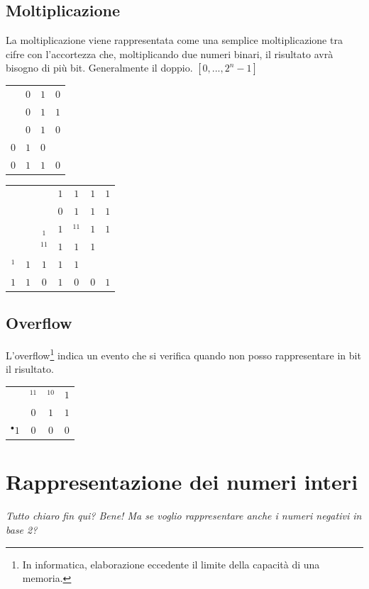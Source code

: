 \subsection*{Moltiplicazione}
La moltiplicazione viene rappresentata come una semplice moltiplicazione tra cifre con l'accortezza che, moltiplicando due numeri binari, il risultato avrà bisogno di più bit. Generalmente il doppio. $[0,...,2^n-1]$
\begin{center}
    \begin{tabular}{c c c c}
        \centering
        & $0$ & $1$ & $0$\\
        & $0$ & $1$ & $1$\\\hline
        & $0$ & $1$ & $0$\\
        $0$ & $1$ & $0$ &\\\hline
        $0$ & $1$ & $1$ & $0$
    \end{tabular}\hspace{1cm}
    \begin{tabular}{c c c c c c c}
        \centering
        &&& $1$ & $1$ & $1$ & $1$\\
        &&& $0$ & $1$ & $1$ & $1$\\\hline
        && $_1$ & $1$ & $^11$ & $1$ & $1$\\
        && $^11$ & $1$ & $1$ & $1$&\\
        $^1$ & $1$ & $1$ & $1$ & $1$&&\\\hline
        $1$ & $1$ & $0$ & $1$ & $0$ & $0$ & $1$
    \end{tabular}
\end{center}

\subsection*{Overflow}
L'overflow\footnote{In informatica, elaborazione eccedente il limite della capacità di una memoria.} indica un evento che si verifica quando non posso rappresentare in bit il risultato.
\begin{center}
    \begin{tabular}{c c c c}
        \centering
        &$^11$ & $^10$ & $1$\\
        &$0$ & $1$ & $1$\\\hline
        $^{\bullet}1$ & $0$ & $0$ & $0$
    \end{tabular}
\end{center}

\section{Rappresentazione dei numeri interi}
\label{sec:interi}
\textit{Tutto chiaro fin qui? Bene! Ma se voglio rappresentare anche i numeri negativi in base 2?}

